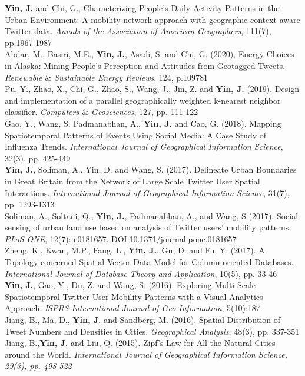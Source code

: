 \documentclass[11pt, a4paper]{article}
\newcommand{\years}[1]{\marginnote{\scriptsize #1}}
\begin{document}
\years{2021}\textbf{Yin, J.} and  Chi, G., Characterizing People’s Daily Activity Patterns in the Urban Environment: A mobility network approach with geographic context-aware Twitter data. \textit{Annals of the Association of American Geographers}, 111(7), pp.1967-1987\\
\years{2020}Abdar, M., Basiri, M.E., \textbf{Yin, J.}, Asadi, S. and Chi, G. (2020), Energy Choices in Alaska: Mining People's Perception and Attitudes from Geotagged Tweets. \textit{Renewable $\&$ Sustainable Energy Reviews}, 124, p.109781\\
\years{2019}Pu, Y., Zhao, X., Chi, G., Zhao, S., Wang, J., Jin, Z. and \textbf{Yin, J.} (2019). Design and implementation of a parallel geographically weighted k-nearest neighbor classifier. \textit{Computers $\&$ Geosciences}, 127, pp. 111-122\\
\years{2018}Gao, Y., Wang, S. Padmanabhan, A., \textbf{Yin, J.} and Cao, G. (2018). Mapping Spatiotemporal Patterns of Events Using Social Media: A Case Study of Influenza Trends. \textit{International Journal of Geographical Information Science}, 32(3), pp. 425-449\\
\years{2017}\textbf{Yin, J.}, Soliman, A., Yin, D. and Wang, S. (2017). Delineate Urban Boundaries in Great Britain from the Network of Large Scale Twitter User Spatial Interactions. \textit{International Journal of Geographical Information Science}, 31(7), pp. 1293-1313\\
\years{2017}Soliman, A., Soltani, Q., \textbf{Yin, J.}, Padmanabhan, A., and Wang, S (2017). Social sensing of urban land use based on analysis of Twitter users' mobility patterns. \textit{PLoS ONE}, 12(7): e0181657. DOI:10.1371/journal.pone.0181657\\
\years{2017}Zheng, K., Kwan, M.P., Fang, L., \textbf{Yin, J.}, Gu, D. and Fu, Y. (2017). A Topology-concerned Spatial Vector Data Model for Column-oriented Databases. \textit{International Journal of Database Theory and Application}, 10(5), pp. 33-46\\
\years{2016}\textbf{Yin, J.}, Gao, Y., Du, Z. and Wang, S. (2016). Exploring Multi-Scale Spatiotemporal Twitter User Mobility Patterns with a Visual-Analytics Approach. \textit{ISPRS International Journal of Geo-Information}, 5(10):187.\\
\years{2016}Jiang, B., Ma, D., \textbf{Yin, J.} and Sandberg, M. (2016). Spatial Distribution of Tweet Numbers and Densities in Cities. \textit{Geographical Analysis}, 48(3), pp. 337-351\\
\years{2015}Jiang, B.,\textbf{Yin, J.} and Liu, Q. (2015). Zipf's Law for All the Natural Cities around the World. \textit{International Journal of Geographical Information Science, 29(3), pp. 498-522}\\
\end{document}
